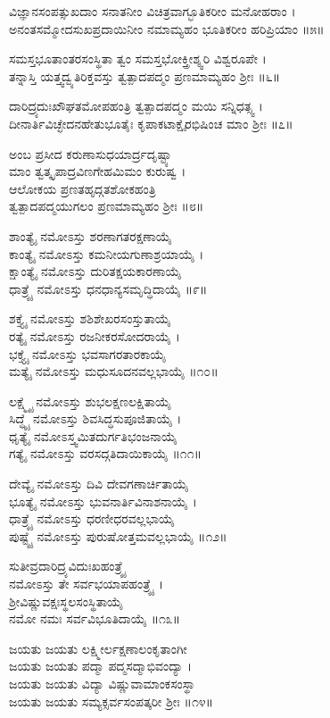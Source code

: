 	ವಿಜ್ಞಾನಸಂಪತ್ಸುಖದಾಂ ಸನಾತನೀಂ ವಿಚಿತ್ರವಾಗ್ಭೂತಿಕರೀಂ ಮನೋಹರಾಂ ।\\
	ಅನಂತಸಮ್ಮೋದಸುಖಪ್ರದಾಯಿನೀಂ ನಮಾಮ್ಯಹಂ ಭೂತಿಕರೀಂ ಹರಿಪ್ರಿಯಾಂ ॥೫॥

ಸಮಸ್ತಭೂತಾಂತರಸಂಸ್ಥಿತಾ ತ್ವಂ ಸಮಸ್ತಭೋಕ್ತ್ರೀಶ್ಶ್ವರಿ ವಿಶ್ವರೂಪೇ ।\\
ತನ್ನಾಸ್ತಿ ಯತ್ತ್ವದ್ವ್ಯತಿರಿಕ್ತವಸ್ತು ತ್ವತ್ಪಾದಪದ್ಮಂ ಪ್ರಣಮಾಮ್ಯಹಂ ಶ್ರೀಃ ॥೬॥

	ದಾರಿದ್ರ್ಯದುಃಖೌಘತಮೋಪಹಂತ್ರಿ ತ್ವತ್ಪಾದಪದ್ಮಂ ಮಯಿ ಸನ್ನಿಧತ್ಸ್ವ ।\\
	ದೀನಾರ್ತಿವಿಚ್ಛೇದನಹೇತುಭೂತೈಃ ಕೃಪಾಕಟಾಕ್ಷೈರಭಿಷಿಂಚ ಮಾಂ ಶ್ರೀಃ ॥೭॥

ಅಂಬ ಪ್ರಸೀದ ಕರುಣಾಸುಧಯಾರ್ದ್ರದೃಷ್ಟ್ಯಾ \\ಮಾಂ ತ್ವತ್ಕೃಪಾದ್ರವಿಣಗೇಹಮಿಮಂ ಕುರುಷ್ವ ।\\
ಆಲೋಕಯ ಪ್ರಣತಹೃದ್ಗತಶೋಕಹಂತ್ರಿ \\ತ್ವತ್ಪಾದಪದ್ಮಯುಗಲಂ ಪ್ರಣಮಾಮ್ಯಹಂ ಶ್ರೀಃ ॥೮॥

	ಶಾಂತ್ಯೈ ನಮೋಽಸ್ತು ಶರಣಾಗತರಕ್ಷಣಾಯೈ\\ ಕಾಂತ್ಯೈ ನಮೋಽಸ್ತು ಕಮನೀಯಗುಣಾಶ್ರಯಾಯೈ ।\\
	ಕ್ಷಾಂತ್ಯೈ ನಮೋಽಸ್ತು ದುರಿತಕ್ಷಯಕಾರಣಾಯೈ \\ಧಾತ್ರ್ಯೈ ನಮೋಽಸ್ತು ಧನಧಾನ್ಯಸಮೃದ್ಧಿದಾಯೈ ॥೯॥

ಶಕ್ತ್ಯೈ ನಮೋಽಸ್ತು ಶಶಿಶೇಖರಸಂಸ್ತುತಾಯೈ\\ ರತ್ಯೈ ನಮೋಽಸ್ತು ರಜನೀಕರಸೋದರಾಯೈ ।\\
ಭಕ್ತ್ಯೈ ನಮೋಽಸ್ತು ಭವಸಾಗರತಾರಕಾಯೈ \\ಮತ್ಯೈ ನಮೋಽಸ್ತು ಮಧುಸೂದನವಲ್ಲಭಾಯೈ ॥೧೦॥

	ಲಕ್ಷ್ಮ್ಯೈ ನಮೋಽಸ್ತು ಶುಭಲಕ್ಷಣಲಕ್ಷಿತಾಯೈ \\ಸಿದ್ಧ್ಯೈ ನಮೋಽಸ್ತು ಶಿವಸಿದ್ಧಸುಪೂಜಿತಾಯೈ ।\\
	ಧೃತ್ಯೈ ನಮೋಽಸ್ತ್ವಮಿತದುರ್ಗತಿಭಂಜನಾಯೈ \\ಗತ್ಯೈ ನಮೋಽಸ್ತು ವರಸದ್ಗತಿದಾಯಿಕಾಯೈ ॥೧೧॥

ದೇವ್ಯೈ ನಮೋಽಸ್ತು ದಿವಿ ದೇವಗಣಾರ್ಚಿತಾಯೈ \\ಭೂತ್ಯೈ ನಮೋಽಸ್ತು ಭುವನಾರ್ತಿವಿನಾಶನಾಯೈ ।\\
ಧಾತ್ರ್ಯೈ ನಮೋಽಸ್ತು ಧರಣೀಧರವಲ್ಲಭಾಯೈ \\ಪುಷ್ಟ್ಯೈ ನಮೋಽಸ್ತು ಪುರುಷೋತ್ತಮವಲ್ಲಭಾಯೈ ॥೧೨॥

	ಸುತೀವ್ರದಾರಿದ್ರ್ಯವಿದುಃಖಹಂತ್ರ್ಯೈ \\ನಮೋಽಸ್ತು ತೇ ಸರ್ವಭಯಾಪಹಂತ್ರ್ಯೈ ।\\
	ಶ್ರೀವಿಷ್ಣುವಕ್ಷಃಸ್ಥಲಸಂಸ್ಥಿತಾಯೈ \\ನಮೋ ನಮಃ ಸರ್ವವಿಭೂತಿದಾಯೈ ॥೧೩॥

ಜಯತು ಜಯತು ಲಕ್ಷ್ಮೀರ್ಲಕ್ಷಣಾಲಂಕೃತಾಂಗೀ\\ ಜಯತು ಜಯತು ಪದ್ಮಾ ಪದ್ಮಸದ್ಮಾಭಿವಂದ್ಯಾ ।\\
ಜಯತು ಜಯತು ವಿದ್ಯಾ ವಿಷ್ಣುವಾಮಾಂಕಸಂಸ್ಥಾ \\ಜಯತು ಜಯತು ಸಮ್ಯಕ್ಸರ್ವಸಂಪತ್ಕರೀ ಶ್ರೀಃ ॥೧೪॥

